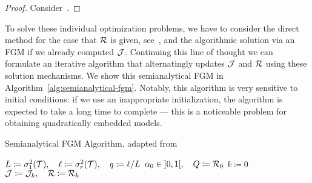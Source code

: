 \begin{proof}
    Consider~\cite[Lemma~2.1]{Deng2003}.
\end{proof}

To solve these individual optimization problems, we have to consider the direct method for the case that $\mathcal{R}$ is given, see~\cite[Theorem~3.4]{Morandin2023}, and the algorithmic solution via an \ac{FGM} if we already computed $\mathcal{J}$.
Continuing this line of thought we can formulate an iterative algorithm that alternatingly updates $\mathcal{J}$ and $\mathcal{R}$ using these solution mechanisms.
We show this semianalytical \ac{FGM} in Algorithm~\ref{alg:semianalytical-fgm}.
Notably, this algorithm is very sensitive to initial conditions: if we use an inappropriate initialization, the algorithm is expected to take a long time to complete --- this is a noticeable problem for obtaining quadratically embedded models.

\begin{algorithm}\label{alg:semianalytical-fgm}
    \caption{Semianalytical \ac{FGM} Algorithm, adapted from~\cite[Algorithm~1]{Morandin2023}}
    $L \coloneqq \sigma_1^2(\mathcal{T}),\quad \ell \coloneqq \sigma_r^2(\mathcal{T}),\quad q \coloneqq \ell / L$\;
    $\alpha_0 \in \interval[open]{0}{1},\quad Q \coloneqq \mcl{R}_0$\;
    $k \coloneqq 0$\;
    $\mathcal{J} \coloneqq \mathcal{J}_k,\quad \mathcal{R} \coloneqq \mathcal{R}_k$\;
\end{algorithm}

